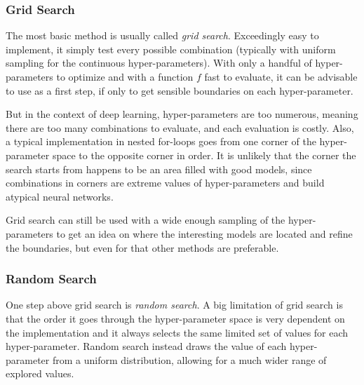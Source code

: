\subsubsection{Grid Search}

The most basic method is usually called \textit{grid search}. Exceedingly easy to implement, it simply test every possible combination (typically with uniform sampling for the continuous hyper-parameters). With only a handful of hyper-parameters to optimize and with a function $f$ fast to evaluate, it can be advisable to use as a first step, if only to get sensible boundaries on each hyper-parameter. 

But in the context of deep learning, hyper-parameters are too numerous, meaning there are too many combinations to evaluate, and each evaluation is costly. Also, a typical implementation in nested for-loops goes from one corner of the hyper-parameter space to the opposite corner in order. It is unlikely that the corner the search starts from happens to be an area filled with good models, since combinations in corners are extreme values of hyper-parameters and build atypical neural networks. 

Grid search can still be used with a wide enough sampling of the hyper-parameters to get an idea on where the interesting models are located and refine the boundaries, but even for that other methods are preferable.

\subsubsection{Random Search}

One step above grid search is \textit{random search}. A big limitation of grid search is that the order it goes through the hyper-parameter space is very dependent on the implementation and it always selects the same limited set of values for each hyper-parameter. Random search instead draws the value of each hyper-parameter from a uniform distribution, allowing for a much wider range of explored values.

